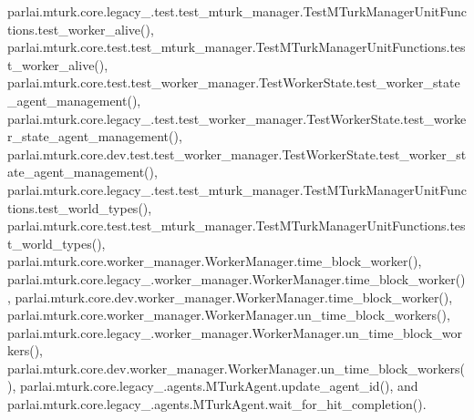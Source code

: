 parlai.\+mturk.\+core.\+legacy\+\_.\+test.\+test\+\_\+mturk\+\_\+manager.\+Test\+M\+Turk\+Manager\+Unit\+Functions.\+test\+\_\+worker\+\_\+alive(), parlai.\+mturk.\+core.\+test.\+test\+\_\+mturk\+\_\+manager.\+Test\+M\+Turk\+Manager\+Unit\+Functions.\+test\+\_\+worker\+\_\+alive(), parlai.\+mturk.\+core.\+test.\+test\+\_\+worker\+\_\+manager.\+Test\+Worker\+State.\+test\+\_\+worker\+\_\+state\+\_\+agent\+\_\+management(), parlai.\+mturk.\+core.\+legacy\+\_.\+test.\+test\+\_\+worker\+\_\+manager.\+Test\+Worker\+State.\+test\+\_\+worker\+\_\+state\+\_\+agent\+\_\+management(), parlai.\+mturk.\+core.\+dev.\+test.\+test\+\_\+worker\+\_\+manager.\+Test\+Worker\+State.\+test\+\_\+worker\+\_\+state\+\_\+agent\+\_\+management(), parlai.\+mturk.\+core.\+legacy\+\_.\+test.\+test\+\_\+mturk\+\_\+manager.\+Test\+M\+Turk\+Manager\+Unit\+Functions.\+test\+\_\+world\+\_\+types(), parlai.\+mturk.\+core.\+test.\+test\+\_\+mturk\+\_\+manager.\+Test\+M\+Turk\+Manager\+Unit\+Functions.\+test\+\_\+world\+\_\+types(), parlai.\+mturk.\+core.\+worker\+\_\+manager.\+Worker\+Manager.\+time\+\_\+block\+\_\+worker(), parlai.\+mturk.\+core.\+legacy\+\_.\+worker\+\_\+manager.\+Worker\+Manager.\+time\+\_\+block\+\_\+worker(), parlai.\+mturk.\+core.\+dev.\+worker\+\_\+manager.\+Worker\+Manager.\+time\+\_\+block\+\_\+worker(), parlai.\+mturk.\+core.\+worker\+\_\+manager.\+Worker\+Manager.\+un\+\_\+time\+\_\+block\+\_\+workers(), parlai.\+mturk.\+core.\+legacy\+\_.\+worker\+\_\+manager.\+Worker\+Manager.\+un\+\_\+time\+\_\+block\+\_\+workers(), parlai.\+mturk.\+core.\+dev.\+worker\+\_\+manager.\+Worker\+Manager.\+un\+\_\+time\+\_\+block\+\_\+workers(), parlai.\+mturk.\+core.\+legacy\+\_.\+agents.\+M\+Turk\+Agent.\+update\+\_\+agent\+\_\+id(), and parlai.\+mturk.\+core.\+legacy\+\_.\+agents.\+M\+Turk\+Agent.\+wait\+\_\+for\+\_\+hit\+\_\+completion().

\mbox{\label{classparlai_1_1mturk_1_1core_1_1dev_1_1test_1_1test__mturk__manager_1_1TestMTurkManagerLifecycleFunctions_af1ac135ec91429e6729faab342eb2026}} 
